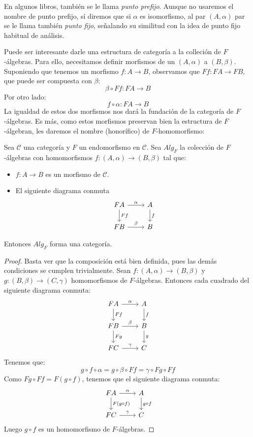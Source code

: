 \documentclass[12pt, twoside]{book}
\newcommand{\cat}{{\mathcal{C}}}
\begin{document}
En algunos libros, también se le llama \emph{punto prefijo}.
Aunque no usaremos el nombre de punto prefijo, sí diremos que si $\alpha$ es isomorfismo, al par $(A,\alpha)$ par se le llama también \emph{punto fijo}, señalando su similitud con la idea de punto fijo habitual de análisis.

Puede ser interesante darle una estructura de categoría a la colleción de $F$-álgebras.
Para ello, necesitamos definir morfismos de un $(A,\alpha)$ a $(B,\beta)$.
Suponiendo que tenemos un morfismo $f \colon A \to B$, observamos que $F f \colon F A \to F B$, que puede ser compuesta con $\beta$:
\[ \beta \circ F f \colon F A \to B \]
Por otro lado:
\[ f \circ \alpha \colon F A \to B \]
La igualdad de estos dos morfismos nos dará la fundación de la categoría de $F$-álgebras.
Es más, como estos morfismos preservan bien la estructura de $F$-álgebran, les daremos el nombre (honorífico) de $F$-homomorfismo:

\begin{proposition}\label{prop:fmorfismo}
Sea $\cat$ una categoría y $F$ un endomorfismo en $\cat$.
Sea $Alg_F$ la colección de $F$-álgebras con homomorfismos $f \colon (A,\alpha) \to (B,\beta)$ tal que:
\begin{itemize}
\item $f \colon A \to B$ es un morfismo de $\cat$.
\item El siguiente diagrama conmuta
\[
\begin{tikzcd}
F A \arrow[r,"\alpha"] \arrow[d,"F f"] & A \arrow[d,"f"]\\
F B \arrow[r,"\beta"] & B
\end{tikzcd}
\]
\end{itemize}
Entonces $Alg_F$ forma una categoría.
\end{proposition}
\begin{proof}
Basta ver que la composición está bien definida, pues las demás condiciones se cumplen trivialmente.
Sean $f \colon (A,\alpha) \to (B,\beta)$ y $g \colon (B,\beta) \to (C,\gamma)$ homomorfismos de $F$-álgebras.
Entonces cada cuadrado del siguiente diagrama conmuta:
\[
\begin{tikzcd}
F A \arrow[r,"\alpha"] \arrow[d,"F f"] & A \arrow[d,"f"]\\
F B \arrow[r,"\beta"] \arrow[d,"F g"] & B \arrow[d,"g"]\\
F C \arrow[r,"\gamma"] & C
\end{tikzcd}
\]
Tenemos que:
\[ g \circ f \circ \alpha = g \circ \beta \circ F f = \gamma \circ F g \circ F f \]
Como $F g \circ F f = F (g \circ f)$, tenemos que el siguiente diagrama conmuta:
\[
\begin{tikzcd}
F A \arrow[r,"\alpha"] \arrow[d,"F (g \circ f)"] & A \arrow[d,"g \circ f"]\\
F C \arrow[r,"\gamma"] & C
\end{tikzcd}
\]
Luego $g \circ f$ es un homomorfismo de $F$-álgebras.
\end{proof}
\end{document}
